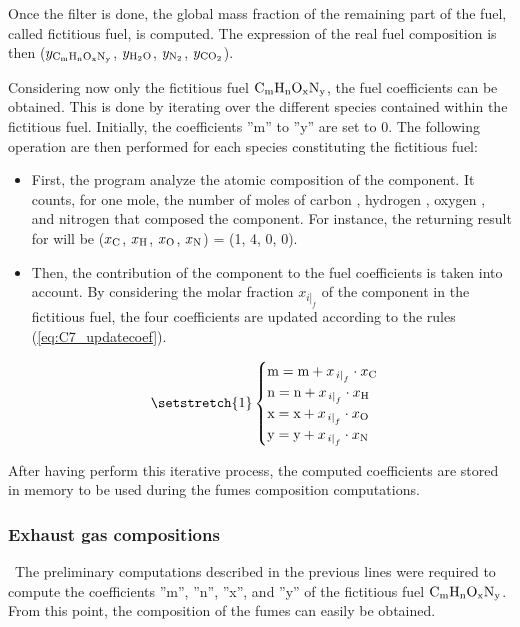 Once the filter is done, the global mass fraction of the remaining part of the fuel, called fictitious fuel, is computed. The expression of the real fuel composition is then  ($y_{\ce{C_{\text{m}}H_{\text{n}}O_{\text{x}}N_{\text{y}}}}$, $y_{\ce{H2O}}$, $y_{\ce{N2}}$, $y_{\ce{CO2}}$).

Considering now only the fictitious fuel $\ce{C_{\text{m}}H_{\text{n}}O_{\text{x}}N_{\text{y}}}$, the fuel coefficients can be obtained. This is done by iterating over the different species contained within the fictitious fuel. Initially, the coefficients ''m'' to ''y'' are set to 0. The following operation are then performed for each species constituting the fictitious fuel:
\begin{itemize}
    \item First, the program analyze the atomic composition of the component. It counts, for one mole, the number of moles of carbon , hydrogen , oxygen , and nitrogen  that composed the component. For instance, the returning result for  will be ($x_{\ce{C}}$, $x_{\ce{H}}$, $x_{\ce{O}}$, $x_{\ce{N}}$) = (1, 4, 0, 0).
    \item Then, the contribution of the component to the fuel coefficients is taken into account. By considering the molar fraction $x_{\left.i\right|_f}$ of the component in the fictitious fuel, the four coefficients are updated according to the rules (\ref{eq:C7_updatecoef}).
    
    \begin{equation}
    \setstretch{1}
        \begin{cases}
        \text{m}=\text{m}+x_{\left.i\right|_f}\cdot x_{\ce{C}}\\
        \text{n}=\text{n}+x_{\left.i\right|_f}\cdot x_{\ce{H}}\\
        \text{x}=\text{x}+x_{\left.i\right|_f}\cdot x_{\ce{O}}\\
        \text{y}=\text{y}+x_{\left.i\right|_f}\cdot x_{\ce{N}}
        \end{cases}\label{eq:C7_updatecoef}
    \end{equation}
\end{itemize}
After having perform this iterative process, the computed coefficients are stored in memory to be used during the fumes composition computations.
\subsubsection{Exhaust gas compositions}
\quad\ The preliminary computations described in the previous lines were required to compute the coefficients ''m'', ''n'', ''x'', and ''y'' of the fictitious fuel $\ce{C_{\text{m}}H_{\text{n}}O_{\text{x}}N_{\text{y}}}$. From this point, the composition of the fumes can easily be obtained. 

